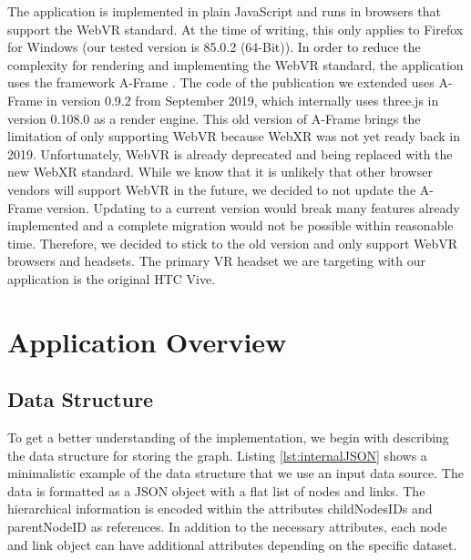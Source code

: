 The application is implemented in plain JavaScript and runs in browsers that support the WebVR standard. 
At the time of writing, this only applies to Firefox for Windows (our tested version is 85.0.2 (64-Bit)). 
In order to reduce the complexity for rendering and implementing the WebVR standard, the application uses the framework A-Frame \cite{aframe}. The code of the publication we extended uses A-Frame in version 0.9.2 from September 2019, which internally uses three.js \cite{threejs} in version 0.108.0 as a render engine.
This old version of A-Frame brings the limitation of only supporting WebVR because WebXR was not yet ready back in 2019.
Unfortunately, WebVR is already deprecated and being replaced with the new WebXR standard.
While we know that it is unlikely that other browser vendors will support WebVR in the future, we decided to not update the A-Frame version. Updating to a current version would break many features already implemented and a complete migration would not be possible within reasonable time. Therefore, we decided to stick to the old version and only support WebVR browsers and headsets.
The primary VR headset we are targeting with our application is the original HTC Vive.

\section{Application Overview}

\label{sec:applOverview}
\subsection{Data Structure}
\label{subSec:dataStruct}
To get a better understanding of the implementation, we begin with describing the data structure for storing the graph.
Listing \ref{lst:internalJSON} shows a minimalistic example of the data structure that we use an input data source. The data is formatted as a JSON object with a flat list of nodes and links. The hierarchical information is encoded within the attributes childNodesIDs and parentNodeID as references. 
In addition to the necessary attributes, each node and link object can have additional attributes depending on the specific dataset.

\pagebreak

